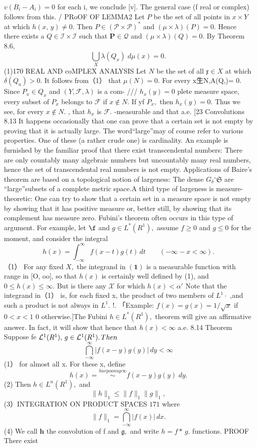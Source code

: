$v(B_{i}-A_{i})=0$ for each i, we conclude [v]. The general case (f real or complex) follows from this. / PRoOF OF LEMMA2 Let ${\mathbf{}}P$ be the set of all points in $x\times Y$ at which $h(x,\,y)\neq0.$ Then $P\in({\mathcal{P}}\times{\mathcal{P}})^{*}$ and $(\mu\times\lambda)(P)=0.$ Hence there exists a $Q\in{\mathcal{I}}\times{\mathcal{I}}$ such that ${\boldsymbol{P}}\in{\mathcal{Q}}$ and $(\mu\times\lambda)(Q)=0.$ By Theorem 8.6, $$ \bigcup_{X}^{}\lambda(Q_{x})\;d\mu(x)=0. $$ (1)170 REAL AND coMPLEX ANALYSIS Let ${\mathbf{}}N$ be the set of all ${\mathfrak{x}}\in X$ at which $\delta(Q_{a})>0.$ It follows from（1） that ${\mu(N)=0}.$ For every x生N,A(Q,)= 0. Since $P_{x}\in Q_{x}$ and $(Y,{\mathcal{F}},\lambda)$ is a com- /// $h_{x}(y)=0$ plete measure space, every subset of $P_{x}$ belongs to $\textstyle{\mathcal{F}}$ if $x\notin N.$ If yf $P_{x},$ then $h_{x}(y)=0.$ Thus we see, for every $x\notin N.$ , that $h_{x}$ is ${\mathcal{F}}.$ -measurable and that a.e. [23 Convolutions 8.13 It happens occasionally that one can prove that a certain set is not empty by proving that it is actually large. The word“large”may of course refer to various properties. One of these (a rather crude one) is cardinality. An example is furnished by the familiar proof that there exist transcendental numbers: There are only countably many algebraic numbers but uncountably many real numbers, hence the set of transcendental real numbers is not empty. Applications of Baire's theorem are based on a topological notion of largeness: The dense $G_{\delta}{}^{\circ}{\mathfrak{S}}$ are “large”subsets of a complete metric space.A third type of largeness is measure-theoretic: One can try to show that a certain set in a measure space is not empty by showing that it has positive measure or, better still, by showing that its complement has measure zero. Fubini's theorem often occurs in this type of argument. For example, let $\boldsymbol{\f}$ and $g\in L^{*}(R^{1}),$ assume $f\geq0$ and $\scriptstyle g\leq0$ for the moment, and consider the integral $$ h(x)=\int_{-\infty}^{\infty}f(x-t)g(t)\,d t\qquad(-\infty-x<\infty). $$ （1） For any fixed $\scriptstyle X,$ the integrand in $\mathbf{(1)}$ is a measurable function with range in [O, oo], so that $h(x)$ is certainly well defined by (1), and $0\leq h(x)\leq\infty.$ But is there any $\scriptstyle{\mathcal{X}}$ for which $h(x)<\alpha\prime$ Note that the integrand in（1） is, for each fixed x, the product of two members of $L^{1}\!\cdot\!$ ,and such a product is not always in $L^{1}.$ !. 「Example: $f(x)=g(x)=1/{\sqrt{x}}$ if $0<x<1$ 0 otherwise.]The Fubini $h\in L^{*}(R^{1}),$ theorem will give an affirmative answer. In fact, it will show that hence that $h(x)<\infty$ a.e. 8.14 Theorem Suppose fe ${\cal L}^{1}(R^{1}),\,g\in{\cal L}^{1}(R^{1}).\,T h e n$ $$ \bigcap_{-\infty}^{\infty}|f(x-y)g(y)|\,d y<\infty $$ (1） for almost all x. For these x, define $$ h(x)=\stackrel{ harpoonup\infty}{\sim}f(x-y)g(y)\;d y. $$ (2) Then $h\in L^{n}(R^{1}),$ and $$ \|h\|_{1}\leq\|f\|_{1}\|g\|_{1}, $$ (3）INTEGRATION ON PRODUCT SPACES $171$ where $$ \|f\|_{1}=\bigcap_{-\infty}^{\infty}|f(x)|\,d x. $$ (4) We call $\boldsymbol{h}$ the convolution of f and ${\mathfrak{g}},$ and write $h=f*\,g.$ functions. PROOF There exist 